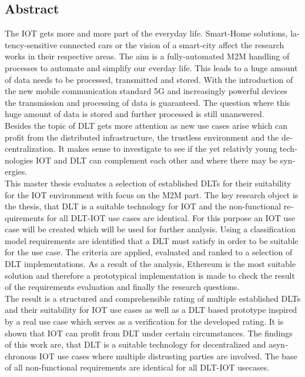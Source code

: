 

\begin{otherlanguage}{american}
	\chapter*{Abstract}
	The \ac{IOT} gets more and more part of the everyday life. Smart-Home solutions, latency-sensitive connected cars or the vision of a smart-city affect the research works in their respective areas. The aim is a fully-automated \ac{M2M} handling of processes to automate and simplify our everday life. This leads to a huge amount of data needs to be processed, transmitted and stored. With the introduction of the new mobile communication standard 5G and increasingly powerful devices the transmission and processing of data is guaranteed. The question where this huge amount of data is stored and further processed is still unanswered.\\
	Besides the topic of \acf{DLT} gets more attention as new use cases arise which can profit from the distributed infrastructure, the trustless environment and the decentralization. It makes sense to investigate to see if the yet relativly young technologies \ac{IOT} and \ac{DLT} can complement each other and where there may be synergies.\\
	This master thesis evaluates a selection of established \acp{DLT} for their suitability for the \ac{IOT} environment with focus on the \ac{M2M} part. The key research object is the thesis, that DLT is a suitable technology for IOT and the non-functional requirements for all \ac{DLT}-\ac{IOT} use cases are identical. For this purpose an \ac{IOT} use case will be created which will be used for further analysis. Using a classification model requirements are identified that a \ac{DLT} must satisfy in order to be suitable for the use case. The criteria are applied, evaluated and ranked to a selection of \ac{DLT} implementations. As a result of the analysis, Ethereum is the most suitable solution and therefore a prototypical implementation is made to check the result of the requirements evaluation and finally the research questions.\\
	The result is a structured and comprehensible rating of multiple established \acp{DLT} and their suitability for \ac{IOT} use cases as well as a \ac{DLT} based prototype inspired by a real use case which serves as a verification for the developed rating. It is shown that \ac{IOT} can profit from \ac{DLT} under certain circumstances. The findings of this work are, that \ac{DLT} is a suitable technology for decentralized and asynchronous \ac{IOT} use cases where multiple distrusting parties are involved. The base of all non-functional requirements are identical for all DLT-\ac{IOT} usecases.
\end{otherlanguage}
